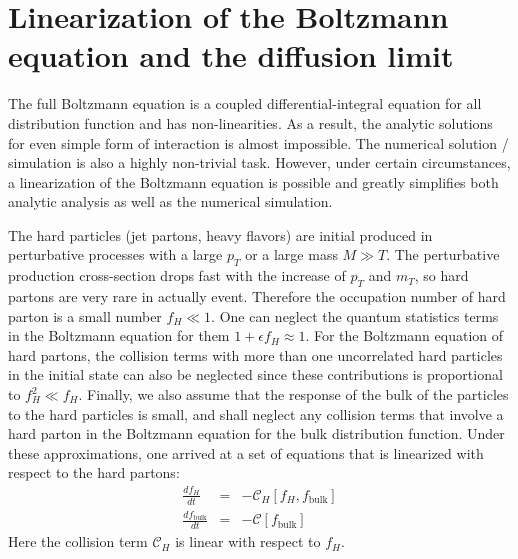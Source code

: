 \section{Linearization of the Boltzmann equation and the diffusion limit}
The full Boltzmann equation is a coupled differential-integral equation for all distribution function and has non-linearities. 
As a result, the analytic solutions for even simple form of interaction is almost impossible.
The numerical solution / simulation is also a highly non-trivial task.
However, under certain circumstances, a linearization of the Boltzmann equation is possible and greatly simplifies both analytic analysis as well as the numerical simulation.

The hard particles (jet partons, heavy flavors) are initial produced in perturbative processes with a large $p_T$ or a large mass $M \gg T$. 
The perturbative production cross-section drops fast with the increase of $p_T$ and $m_T$, so hard partons are very rare in actually event. 
Therefore the occupation number of hard parton is a small number $f_H \ll 1$.
One can neglect the quantum statistics terms in the Boltzmann equation for them $1+\epsilon f_H \approx 1$.
For the Boltzmann equation of hard partons, the collision terms with more than one uncorrelated hard particles in the initial state can also be neglected since these contributions is proportional to $f_H^2 \ll f_H$. 
Finally, we also assume that the response of the bulk of the particles to the hard particles is small, and shall neglect any collision terms that involve a hard parton in the Boltzmann equation for the bulk distribution function.
Under these approximations, one arrived at a set of equations that is linearized with respect to the hard partons:
\begin{eqnarray}
\frac{df_H}{dt} &=& -\mathcal{C}_H[f_H, f_{\textrm{bulk}}] \label{eq:hard-bulk-eq}\\
\frac{df_{\textrm{bulk}}}{dt} &=& -\mathcal{C}[f_{\textrm{bulk}}]
\end{eqnarray}
Here the collision term $\mathcal{C}_H$ is linear with respect to $f_H$.

